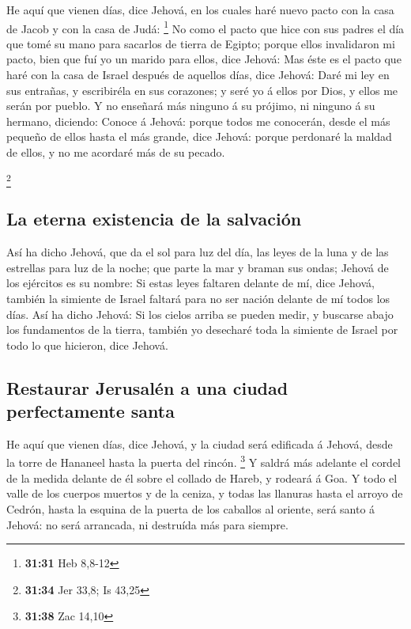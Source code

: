  He aquí que vienen días, dice Jehová, en los cuales haré
nuevo pacto con la casa de Jacob y con la casa de Judá: \footnote{\textbf{31:31}
  Heb 8,8-12}  No como el pacto que hice con sus padres
el día que tomé su mano para sacarlos de tierra de Egipto; porque ellos
invalidaron mi pacto, bien que fuí yo un marido para ellos, dice Jehová:
 Mas éste es el pacto que haré con la casa de Israel
después de aquellos días, dice Jehová: Daré mi ley en sus entrañas, y
escribiréla en sus corazones; y seré yo á ellos por Dios, y ellos me
serán por pueblo.  Y no enseñará más ninguno á su
prójimo, ni ninguno á su hermano, diciendo: Conoce á Jehová: porque
todos me conocerán, desde el más pequeño de ellos hasta el más grande,
dice Jehová: porque perdonaré la maldad de ellos, y no me acordaré más
de su pecado.

\footnote{\textbf{31:34} Jer 33,8; Is 43,25}

\hypertarget{la-eterna-existencia-de-la-salvaciuxf3n}{%
\subsection{La eterna existencia de la
salvación}\label{la-eterna-existencia-de-la-salvaciuxf3n}}

 Así ha dicho Jehová, que da el sol para luz del día, las
leyes de la luna y de las estrellas para luz de la noche; que parte la
mar y braman sus ondas; Jehová de los ejércitos es su nombre:
 Si estas leyes faltaren delante de mí, dice Jehová,
también la simiente de Israel faltará para no ser nación delante de mí
todos los días.  Así ha dicho Jehová: Si los cielos
arriba se pueden medir, y buscarse abajo los fundamentos de la tierra,
también yo desecharé toda la simiente de Israel por todo lo que
hicieron, dice Jehová.

\hypertarget{restaurar-jerusaluxe9n-a-una-ciudad-perfectamente-santa}{%
\subsection{Restaurar Jerusalén a una ciudad perfectamente
santa}\label{restaurar-jerusaluxe9n-a-una-ciudad-perfectamente-santa}}

 He aquí que vienen días, dice Jehová, y la ciudad será
edificada á Jehová, desde la torre de Hananeel hasta la puerta del
rincón. \footnote{\textbf{31:38} Zac 14,10}  Y saldrá más
adelante el cordel de la medida delante de él sobre el collado de Hareb,
y rodeará á Goa.  Y todo el valle de los cuerpos muertos
y de la ceniza, y todas las llanuras hasta el arroyo de Cedrón, hasta la
esquina de la puerta de los caballos al oriente, será santo á Jehová: no
será arrancada, ni destruída más para siempre.

